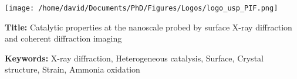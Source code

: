 \newpage
\thispagestyle{empty}

\lhead{}
\rhead{}
\rfoot{}
\cfoot{}
\lfoot{}

\noindent
\texttt{[image: /home/david/Documents/PhD/Figures/Logos/logo\_usp\_PIF.png]}
\vspace{0.5cm}

\small

\begin{mdframed}[linecolor=Prune,linewidth=1]

\textbf{Title:} Catalytic properties at the nanoscale probed by surface X-ray diffraction and coherent diffraction imaging

\noindent \textbf{Keywords:} X-ray diffraction, Heterogeneous catalysis, Surface, Crystal structure, Strain, Ammonia oxidation


\end{mdframed}
